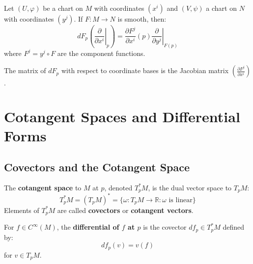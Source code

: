 \begin{proposition}
    Let $(U, \varphi)$ be a chart on $M$ with coordinates $(x^i)$ and $(V, \psi)$ a chart on $N$ with coordinates $(y^j)$. If $F: M \to N$ is smooth, then:
    \[
        dF_p\left(\left.\frac{\partial}{\partial x^i}\right|_p\right) = \frac{\partial F^j}{\partial x^i}(p) \left.\frac{\partial}{\partial y^j}\right|_{F(p)}
    \]
    where $F^j = y^j \circ F$ are the component functions.
\end{proposition}

\begin{corollary}
    The matrix of $dF_p$ with respect to coordinate bases is the Jacobian matrix $\left(\frac{\partial F^j}{\partial x^i}\right)$.
\end{corollary}

\chapter{Cotangent Spaces and Differential Forms}

\section{Covectors and the Cotangent Space}

\begin{definition}
    The \textbf{cotangent space} to $M$ at $p$, denoted $T_p^*M$, is the dual vector space to $T_pM$:
    \[
        T_p^*M = (T_pM)^* = \{\omega: T_pM \to \mathbb{R} : \omega \text{ is linear}\}
    \]
    Elements of $T_p^*M$ are called \textbf{covectors} or \textbf{cotangent vectors}.
\end{definition}

\begin{definition}
    For $f \in C^\infty(M)$, the \textbf{differential of $f$ at $p$} is the covector $df_p \in T_p^*M$ defined by:
    \[
        df_p(v) = v(f)
    \]
    for $v \in T_pM$.
\end{definition}

